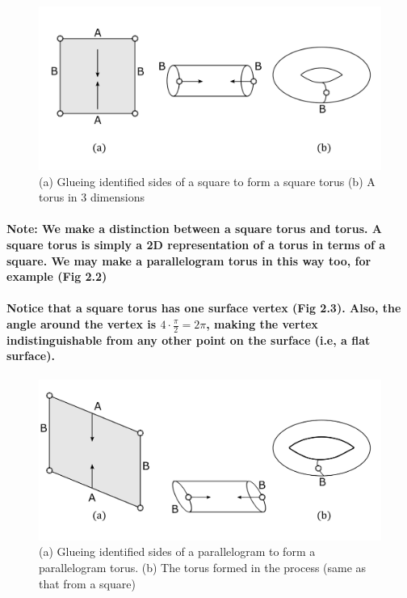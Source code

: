 \documentclass{report}
\begin{document}
\begin{figure}[h]
\begin{center}
\includegraphics[scale=0.3]{2.1}
\caption{(a) Glueing identified sides of a square to form a square torus (b) A torus in 3 dimensions}
\end{center}
\end{figure}

\pagebreak


\paragraph{Note: We make a distinction between a square torus and  torus. A square torus is simply a 2D representation of a torus in terms of a square. We may make a parallelogram torus in this way too, for example (Fig 2.2)}

\paragraph{Notice that a square torus has one surface vertex (Fig 2.3). Also, the angle around the vertex is $4\cdot\frac{\pi}{2} = 2\pi$, making the vertex indistinguishable from any other point on the surface (i.e, a flat surface).}


\begin{figure}[h] 
\begin{center}
\includegraphics[scale=0.3]{2.2}
\caption{(a) Glueing identified sides of a parallelogram to form a parallelogram torus. (b) The torus formed in the process (same as that from a square)}
\end{center}
\end{figure}
\end{document}
